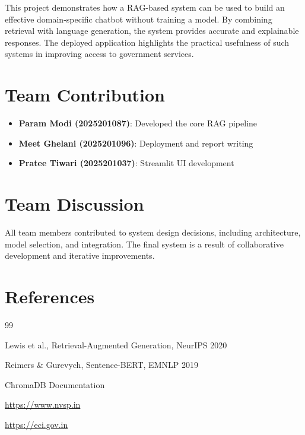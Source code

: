 \documentclass[11pt,a4paper]{article}
\begin{document}
This project demonstrates how a RAG-based system can be used to build an effective domain-specific chatbot without training a model. By combining retrieval with language generation, the system provides accurate and explainable responses. The deployed application highlights the practical usefulness of such systems in improving access to government services.

\section*{Team Contribution}

\begin{itemize}
    \item \textbf{Param Modi (2025201087)}: Developed the core RAG pipeline
    \item \textbf{Meet Ghelani (2025201096)}: Deployment and report writing
    \item \textbf{Pratee Tiwari (2025201037)}: Streamlit UI development
\end{itemize}

\section*{Team Discussion}

All team members contributed to system design decisions, including architecture, model selection, and integration. The final system is a result of collaborative development and iterative improvements.

\section{References}

\begin{thebibliography}{99}

Lewis et al., Retrieval-Augmented Generation, NeurIPS 2020

Reimers \& Gurevych, Sentence-BERT, EMNLP 2019

ChromaDB Documentation

\url{https://www.nvsp.in}

\url{https://eci.gov.in}

\end{thebibliography}
\end{document}
